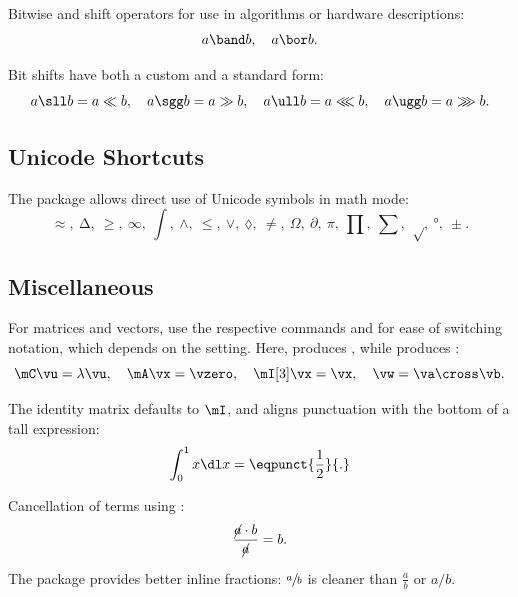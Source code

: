 Bitwise and shift operators for use in algorithms or hardware descriptions:
\begin{equation*}
  a \band b,
  \quad a \bor b.
\end{equation*}

\noindent
Bit shifts have both a custom and a standard form:
\begin{equation*}
  a \sll b = a \ll b,
  \quad a \sgg b = a \gg b,
  \quad a \ull b = a \lll b,
  \quad a \ugg b = a \ggg b.
\end{equation*}

\subsection{Unicode Shortcuts}

The  package allows direct use of Unicode symbols in math mode:
\begin{equation*}
  ≈,\ ∆,\ ≥,\ ∞,\ ∫,\ ∧,\ ≤,\ ∨,\ ◊,\ ≠,\ Ω,\ ∂,\ π,\ ∏,\ ∑,\ √,\ °,\ ±.
\end{equation*}

\subsection{Miscellaneous}

For matrices and vectors, use the respective commands \latexinline{\mat} and \latexinline{\vect} for ease of switching notation, which depends on the setting. Here, \latexinline{\mat} produces \latexinline{\mathbf}, while \latexinline{\vect} produces \latexinline{\bm}:
\begin{equation*}
  \mC\vu = \lambda \vu,
  \quad \mA\vx = \vzero,
  \quad \mI[3]\vx = \vx,
  \quad \vw = \va \cross \vb.
\end{equation*}

The identity matrix \latexinline{\mI} defaults to $\mI$, and  aligns punctuation with the bottom of a tall expression:
\begin{equation*}
  \int_0^1 x \dl x = \eqpunct{\frac{1}{2}}{.}
\end{equation*}

Cancellation of terms using :
\begin{equation*}
  \frac{\cancel{a} \cdot b}{\cancel{a}} = b.
\end{equation*}

The  package provides better inline fractions: $\sfrac{a}{b}$ is cleaner than $\frac{a}{b}$ or $a/b$.

